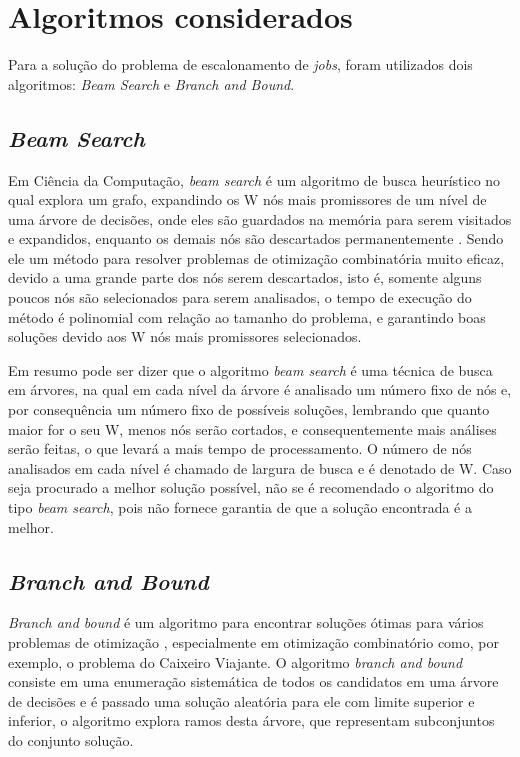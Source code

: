 \documentclass[
	11pt,				%
	oneside,			%
	a4paper,			%
	english,			%
	brazil,				%
	]{article}
\begin{document}
\section{Algoritmos considerados}
Para a solução do problema de escalonamento de \textit{jobs}, foram utilizados dois algoritmos: \textit{Beam Search} e \textit{Branch and Bound}.

\subsection{\textit{Beam Search}}
Em Ciência da Computação, \textit{beam search} é um algoritmo de busca heurístico no qual explora um grafo, expandindo os W nós mais promissores  de um nível de uma árvore de decisões, onde eles são guardados na memória para serem visitados e expandidos, enquanto os demais nós são descartados permanentemente \cite{bs}. Sendo ele um método para resolver problemas de otimização combinatória muito eficaz, devido a uma grande parte dos nós serem descartados, isto é, somente alguns poucos nós são selecionados para serem analisados, o tempo de execução do método é polinomial com relação ao tamanho do problema, e garantindo boas soluções devido aos W nós mais promissores selecionados.

Em resumo pode ser dizer que o algoritmo \textit{beam search} é uma técnica de busca em árvores, na qual em cada nível da árvore é analisado um número fixo de nós e, por consequência um número fixo de possíveis soluções, lembrando que quanto maior for o seu W, menos nós serão cortados, e consequentemente mais análises serão feitas, o que levará a mais tempo de processamento. O número de nós analisados em cada nível é chamado de largura de busca e é denotado de W. Caso seja procurado a melhor solução possível, não se é recomendado o algoritmo do tipo \textit{beam search}, pois não fornece garantia de que a solução encontrada é a melhor.

\subsection{\textit{Branch and Bound}}
\textit{Branch and bound} é um algoritmo para encontrar soluções ótimas para vários problemas de otimização \cite{bb}, especialmente em otimização combinatório como, por exemplo, o problema do Caixeiro Viajante. O algoritmo \textit{branch and bound} consiste em uma enumeração sistemática de todos os candidatos em uma árvore de decisões e é passado uma solução aleatória para ele com limite superior e inferior, o algoritmo explora ramos desta árvore, que representam subconjuntos do conjunto solução.
\end{document}
